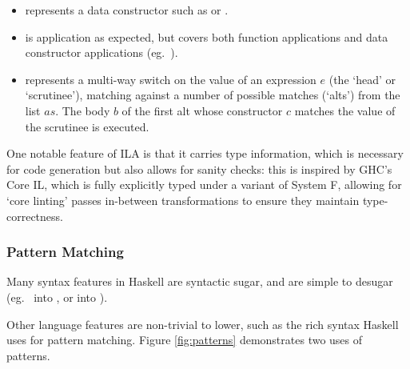 \documentclass[dissertation.tex]{subfiles}
\begin{document}
{{{            \begin{itemize}
            \item {} represents a data constructor such as  or .
            \item
            {
                 is application as expected, but covers both function applications and data constructor applications (eg.\ ).
            }
            \item
            {
                 represents a multi-way switch on the value of an expression \(e\) (the `head' or `scrutinee'), matching against a number of possible matches (`alts') from the list \(as\). The body \(b\) of the first alt  whose constructor \(c\) matches the value of the scrutinee is executed.
            }
            \end{itemize}

            One notable feature of ILA is that it carries type information, which is necessary for code generation but also allows for sanity checks: this is inspired by GHC's Core IL, which is fully explicitly typed under a variant of System F, allowing for `core linting' passes in-between transformations to ensure they maintain type-correctness.
        }
        \subsubsection{Pattern Matching}
        {
            Many syntax features in Haskell are syntactic sugar, and are simple to desugar (eg.\ \haskell{[1, 2]} into , or  into ).

            Other language features are non-trivial to lower, such as the rich syntax Haskell uses for pattern matching. Figure \ref{fig:patterns} demonstrates two uses of patterns.

}}}
\end{document}
